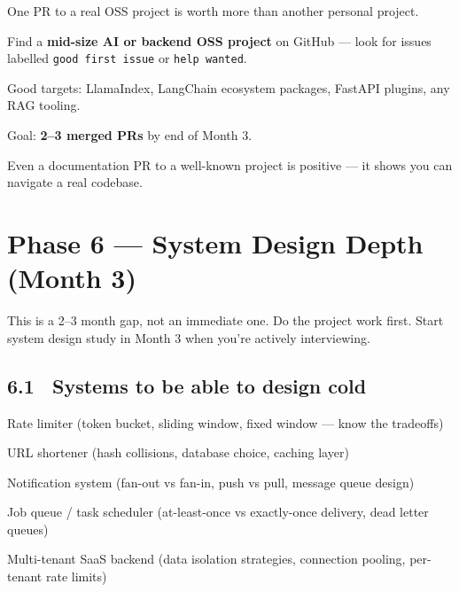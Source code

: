 \documentclass[11pt, a4paper]{article}
\begin{document}
One PR to a real OSS project is worth more than another personal project.

\begin{checklist}
  \item Find a \textbf{mid-size AI or backend OSS project} on GitHub — look for issues labelled \texttt{good first issue} or \texttt{help wanted}.
  \item Good targets: LlamaIndex, LangChain ecosystem packages, FastAPI plugins, any RAG tooling.
  \item Goal: \textbf{2--3 merged PRs} by end of Month 3.
  \item Even a documentation PR to a well-known project is positive — it shows you can navigate a real codebase.
\end{checklist}

\section{Phase 6 — System Design Depth (Month 3)}

\begin{warningbox}
This is a 2--3 month gap, not an immediate one. Do the project work first. Start system design study in Month 3 when you're actively interviewing.
\end{warningbox}

\subsection{6.1 \ Systems to be able to design cold}

\begin{checklist}
  \item Rate limiter (token bucket, sliding window, fixed window — know the tradeoffs)
  \item URL shortener (hash collisions, database choice, caching layer)
  \item Notification system (fan-out vs fan-in, push vs pull, message queue design)
  \item Job queue / task scheduler (at-least-once vs exactly-once delivery, dead letter queues)
  \item Multi-tenant SaaS backend (data isolation strategies, connection pooling, per-tenant rate limits)
\end{checklist}
\end{document}
